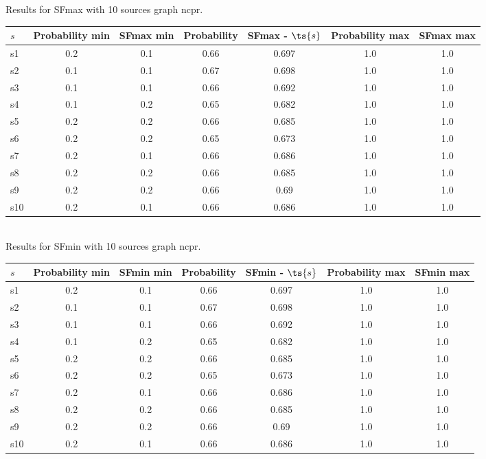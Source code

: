 \documentclass{article}
\begin{document}
\noindent Results for SFmax with 10 sources graph ncpr.

\noindent\begin{tabular}{|l|c|c|c|c|c|c|}
\hline
$s$& Probability min & SFmax min & Probability & SFmax - $\ts{s}$ & Probability max & SFmax max\\
\hline
s1 &0.2 & 0.1 & 0.66 & 0.697 & 1.0 & 1.0\\
\hline
s2 &0.1 & 0.1 & 0.67 & 0.698 & 1.0 & 1.0\\
\hline
s3 &0.1 & 0.1 & 0.66 & 0.692 & 1.0 & 1.0\\
\hline
s4 &0.1 & 0.2 & 0.65 & 0.682 & 1.0 & 1.0\\
\hline
s5 &0.2 & 0.2 & 0.66 & 0.685 & 1.0 & 1.0\\
\hline
s6 &0.2 & 0.2 & 0.65 & 0.673 & 1.0 & 1.0\\
\hline
s7 &0.2 & 0.1 & 0.66 & 0.686 & 1.0 & 1.0\\
\hline
s8 &0.2 & 0.2 & 0.66 & 0.685 & 1.0 & 1.0\\
\hline
s9 &0.2 & 0.2 & 0.66 & 0.69 & 1.0 & 1.0\\
\hline
s10 &0.2 & 0.1 & 0.66 & 0.686 & 1.0 & 1.0\\
\hline
\end{tabular}\\

\noindent Results for SFmin with 10 sources graph ncpr.

\noindent\begin{tabular}{|l|c|c|c|c|c|c|}
\hline
$s$& Probability min & SFmin min & Probability & SFmin - $\ts{s}$ & Probability max & SFmin max\\
\hline
s1 &0.2 & 0.1 & 0.66 & 0.697 & 1.0 & 1.0\\
\hline
s2 &0.1 & 0.1 & 0.67 & 0.698 & 1.0 & 1.0\\
\hline
s3 &0.1 & 0.1 & 0.66 & 0.692 & 1.0 & 1.0\\
\hline
s4 &0.1 & 0.2 & 0.65 & 0.682 & 1.0 & 1.0\\
\hline
s5 &0.2 & 0.2 & 0.66 & 0.685 & 1.0 & 1.0\\
\hline
s6 &0.2 & 0.2 & 0.65 & 0.673 & 1.0 & 1.0\\
\hline
s7 &0.2 & 0.1 & 0.66 & 0.686 & 1.0 & 1.0\\
\hline
s8 &0.2 & 0.2 & 0.66 & 0.685 & 1.0 & 1.0\\
\hline
s9 &0.2 & 0.2 & 0.66 & 0.69 & 1.0 & 1.0\\
\hline
s10 &0.2 & 0.1 & 0.66 & 0.686 & 1.0 & 1.0\\
\hline
\end{tabular}\\
\end{document}
